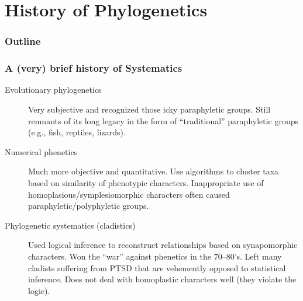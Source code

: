 \section{History of Phylogenetics}

\begin{frame}
\frametitle{Outline}
\tableofcontents[currentsection]
\end{frame}
        
\begin{frame}
    \frametitle{A (very) brief history of Systematics} 
    \begin{description}
        \item[Evolutionary phylogenetics] Very subjective and recognized those
            icky paraphyletic groups. Still remnants of its long legacy in the
            form of ``traditional'' paraphyletic groups (e.g., fish, reptiles,
            lizards).
        \item[Numerical phenetics] Much more objective and quantitative.  Use
            algorithms to cluster taxa based on similarity of phenotypic
            characters. Inappropriate use of homoplasious/symplesiomorphic
            characters often caused paraphyletic/polyphyletic groups.
        \item[Phylogenetic systematics (cladistics)]
            Used logical inference to reconstruct relationships based on
            synapomorphic characters. Won the ``war'' against phenetics in the
            70--80's. Left many cladists suffering from PTSD that are
            vehemently opposed to statistical inference.
            Does not deal with homoplastic characters well (they violate the
            logic).
    \end{description}
\end{frame}

